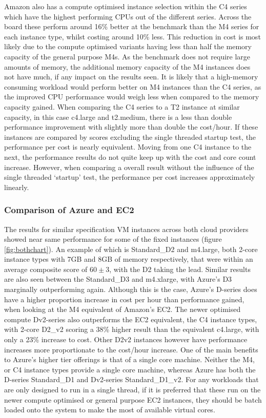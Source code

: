 \documentclass{entcs} \usepackage{entcsmacro}
\begin{document}
Amazon also has a compute optimised instance selection within the C4 series which have the highest performing CPUs out of the different series. Across the board these perform around 16\% better at the benchmark than the M4 series for each instance type, whilst costing around 10\% less. This reduction in cost is most likely due to the compute optimised variants having less than half the memory capacity of the general purpose M4s. As the benchmark does not require large amounts of memory, the additional memory capacity of the M4 instances does not have much, if any impact on the results seen. It is likely that a high-memory consuming workload would perform better on M4 instances than the C4 series, as the improved CPU performance would weigh less when compared to the memory capacity gained. When comparing the C4 series to a T2 instance at similar capacity, in this case c4.large and t2.medium, there is a less than double performance improvement with slightly more than double the cost/hour. If these instances are compared by scores excluding the single threaded startup test, the performance per cost is nearly equivalent. Moving from one C4 instance to the next, the performance results do not quite keep up with the cost and core count increase. However, when comparing a overall result without the influence of the single threaded `startup' test, the performance per cost increases approximately linearly.


\subsubsection{Comparison of Azure and EC2}

The results for similar specification VM instances across both cloud providers showed near same performance for some of the fixed instances (figure \ref{fig:bothchart}). An example of which is Standard\_D2 and m4.large, both 2-core instance types with 7GB and 8GB of memory respectively, that were within an average composite score of $60\pm3$, with the D2 taking the lead. Similar results are also seen between the Standard\_D3 and m4.xlarge, with Azure's D3 marginally outperforming again. Although this is the case, Azure's D-series does have a higher proportion increase in cost per hour than performance gained, when looking at the M4 equivalent of Amazon's EC2. The newer optimised compute Dv2-series also outperforms the EC2 equivalent, the C4 instance types, with 2-core D2\_v2 scoring a 38\% higher result than the equivalent c4.large, with only a 23\% increase to cost. Other D2v2 instances however have performance increases more proportionate to the cost/hour increase. One of the main benefits to Azure's higher tier offerings is that of a single core machine. Neither the M4, or C4 instance types provide a single core machine, whereas Azure has both the D-series Standard\_D1 and Dv2-series Standard\_D1\_v2. For any workloads that are only designed to run in a single thread, if it is preferred that these run on the newer compute optimised or general purpose EC2 instances, they should be batch loaded onto the system to make the most of available virtual cores.
\end{document}
